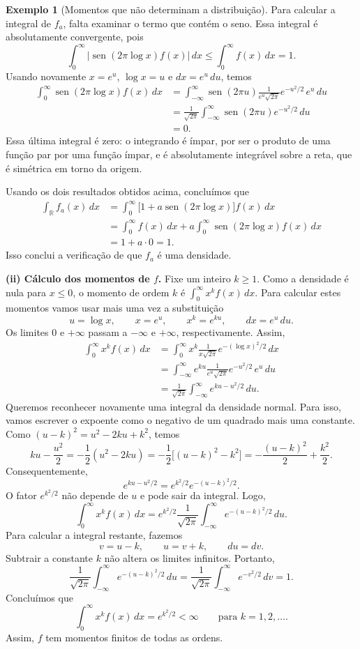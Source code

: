\documentclass[12pt,portuguese]{article}
\theoremstyle{definition}
\newtheorem{example}[example]{Exemplo}
\theoremstyle{plainexercise}
\theoremstyle{starredexercise}
\theoremstyle{definition}
\renewcommand{\sin}{\operatorname{sen}}
\begin{document}
\begin{example}[Momentos que não determinam a distribuição]
Para calcular a integral de $f_a$, falta examinar o termo que contém o
seno. Essa integral é absolutamente convergente, pois
\[
\int_0^\infty\bigl|\sin(2\pi\log x)f(x)\bigr|\,dx
\leqslant\int_0^\infty f(x)\,dx=1.
\]
Usando novamente $x=e^u$, $\log x=u$ e $dx=e^u\,du$, temos
\begin{align*}
\int_0^\infty\sin(2\pi\log x)f(x)\,dx
&=\int_{-\infty}^{\infty}\sin(2\pi u)
  \frac{1}{e^u\sqrt{2\pi}}e^{-u^2/2}\,e^u\,du
\\[0.3cm]
&=\frac{1}{\sqrt{2\pi}}\int_{-\infty}^{\infty}
  \sin(2\pi u)e^{-u^2/2}\,du
\\[0.3cm]
&=
0.
\end{align*}
Essa última integral é zero: o integrando é ímpar, por ser o produto de
uma função par por uma função ímpar, e é absolutamente integrável sobre
a reta, que é simétrica em torno da origem.

Usando os dois resultados obtidos acima, concluímos que
\begin{align*}
\int_{\mathbb{R}}f_a(x)\,dx
&=\int_0^\infty\bigl[1+a\sin(2\pi\log x)\bigr]f(x)\,dx
\\[0.3cm]
&=\int_0^\infty f(x)\,dx
  +a\int_0^\infty\sin(2\pi\log x)f(x)\,dx
\\[0.3cm]
&=1+a\cdot 0=1.
\end{align*}
Isso conclui a verificação de que $f_a$ é uma densidade.

\smallskip
\noindent\textbf{(ii) Cálculo dos momentos de $f$.}
Fixe um inteiro $k\geqslant 1$. Como a densidade é nula para $x\leqslant 0$,
o momento de ordem $k$ é $\int_0^\infty x^k f(x)\,dx$.
Para calcular estes momentos vamos usar mais uma vez a substituição
\[
u=\log x,\qquad x=e^u,\qquad x^k=e^{ku},\qquad dx=e^u\,du.
\]
Os limites $0$ e $+\infty$ passam a $-\infty$ e $+\infty$,
respectivamente. Assim,
\begin{align*}
\int_0^\infty x^k f(x)\,dx
&=\int_0^\infty x^k\frac{1}{x\sqrt{2\pi}}
  e^{-(\log x)^2/2}\,dx
\\[0.3cm]
&=\int_{-\infty}^{\infty}e^{ku}\frac{1}{e^u\sqrt{2\pi}}
  e^{-u^2/2}\,e^u\,du
\\[0.3cm]
&=\frac{1}{\sqrt{2\pi}}\int_{-\infty}^{\infty}e^{ku-u^2/2}\,du.
\end{align*}
Queremos reconhecer novamente uma integral da densidade normal. Para isso,
vamos escrever o expoente como o negativo de um quadrado mais uma constante.
Como $(u-k)^2=u^2-2ku+k^2$, temos
\[
ku-\frac{u^2}{2}
=-\frac12(u^2-2ku)
=-\frac12\bigl[(u-k)^2-k^2\bigr]
=-\frac{(u-k)^2}{2}+\frac{k^2}{2}.
\]
Consequentemente,
\[
e^{ku-u^2/2}=e^{k^2/2}e^{-(u-k)^2/2}.
\]
O fator $e^{k^2/2}$ não depende de $u$ e pode sair da integral. Logo,
\[
\int_0^\infty x^k f(x)\,dx
=e^{k^2/2}\frac{1}{\sqrt{2\pi}}
  \int_{-\infty}^{\infty}e^{-(u-k)^2/2}\,du.
\]
Para calcular a integral restante, fazemos
\[
v=u-k,\qquad u=v+k,\qquad du=dv.
\]
Subtrair a constante $k$ não altera os limites infinitos. Portanto,
\[
\frac{1}{\sqrt{2\pi}}\int_{-\infty}^{\infty}e^{-(u-k)^2/2}\,du
=\frac{1}{\sqrt{2\pi}}\int_{-\infty}^{\infty}e^{-v^2/2}\,dv
=1.
\]
Concluímos que
\[
\int_0^\infty x^k f(x)\,dx=e^{k^2/2}<\infty
\qquad\text{para }k=1,2,\ldots.
\]
Assim, $f$ tem momentos finitos de todas as ordens.


\end{example}
\end{document}
